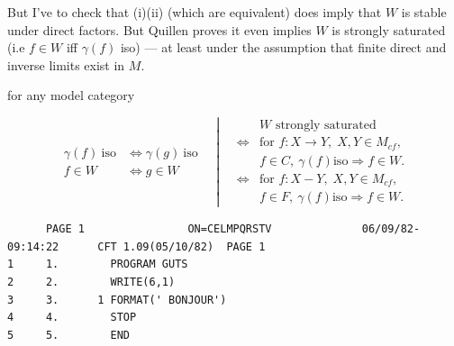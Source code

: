 {But I've to check that (i)(ii) (which are equivalent) does imply that \uline{$W$} is stable under direct factors. But Quillen proves it even implies $W$ is strongly saturated (i.e $f\in W$ iff $\gamma(f)$ iso) --- at least under the assumption that finite direct and inverse limits exist in $M$.

for any model category


\[
\begin{aligned}\gamma(f)\ \mathrm{iso}&\Longleftrightarrow\gamma(g)\ \mathrm{iso}\\
f\in W&\Longleftrightarrow g\in W\end{aligned}
\quad\left|\quad
\begin{aligned}
&W\text{ strongly saturated}\\
\Longleftrightarrow{}&\text{for }f:X\to Y,\;X,Y\in M_{cf},\\
&f\in C,\ \gamma(f)\mathrm{iso}\Rightarrow f\in W.\\
\Longleftrightarrow{}&\text{for }f:X-Y,\;X,Y\in M_{cf},\\
&f\in F,\ \gamma(f)\mathrm{iso}\Rightarrow f\in W.
\end{aligned}\right.
\]}

{\fontsize{5}{6}\selectfont
\begin{verbatim}
      PAGE 1                ON=CELMPQRSTV              06/09/82-09:14:22      CFT 1.09(05/10/82)  PAGE 1
1     1.        PROGRAM GUTS
2     2.        WRITE(6,1)
3     3.      1 FORMAT(' BONJOUR')
4     4.        STOP
5     5.        END
\end{verbatim}
}
